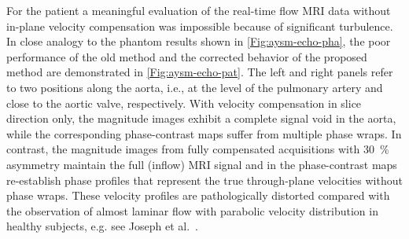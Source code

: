 For the patient a meaningful evaluation of the real-time flow MRI data without in-plane velocity compensation was impossible because of significant turbulence. In close analogy to the phantom results shown in \cref{Fig:aysm-echo-pha}, the poor performance of the old method and the corrected behavior of the proposed method are demonstrated in \cref{Fig:aysm-echo-pat}. The left and right panels refer to two positions along the aorta, i.e., at the level of the pulmonary artery and close to the aortic valve, respectively. With velocity compensation in slice direction only, the magnitude images exhibit a complete signal void in the aorta, while the corresponding phase-contrast maps suffer from multiple phase wraps. In contrast, the magnitude images from fully compensated acquisitions with \SI{30}{\percent} asymmetry maintain the full (inflow) MRI signal and in the phase-contrast maps re-establish phase profiles that represent the true through-plane velocities without phase wraps. These velocity profiles are pathologically distorted compared with the observation of almost laminar flow with parabolic velocity distribution in healthy subjects, e.g. see Joseph et al.~\cite{2012_PC_Joseph}.

